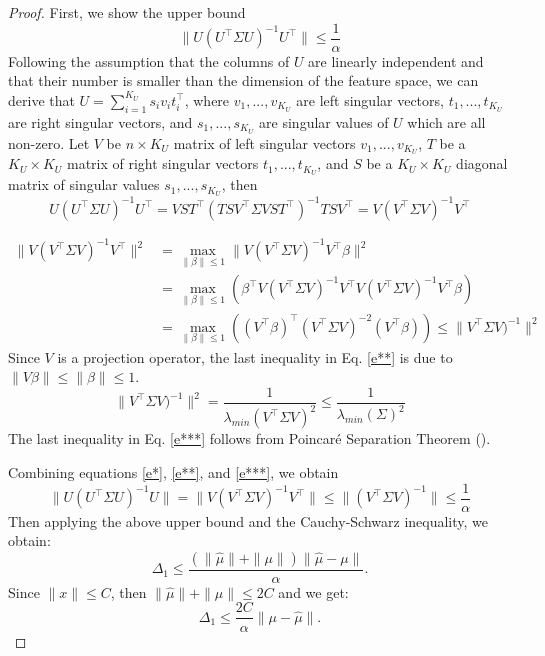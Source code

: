 \documentclass[twoside,11pt]{article}
\begin{document}
\begin{proof}
First, we show the upper bound
\begin{equation}
\label{eq:U_bound}
\|U(U^\top \Sigma U)^{-1}U^\top\| \leq \frac{1}{\alpha}
\end{equation}
Following the assumption that the columns of $U$ are linearly independent and that their number is smaller than the dimension of the feature space, we can derive that
$U=\sum_{i=1}^{K_U} s_i v_i t_i^\top$, where $v_1,...,v_{K_U}$ are left singular vectors, $t_1,...,t_{K_U}$ are right singular vectors, and $s_1,...,s_{K_U}$ are singular values of $U$ which are all non-zero. %
Let $V$ be $n\times {K_U}$ matrix of left singular vectors $v_1,...,v_{K_U}$, $T$ be a $K_U\times K_U$ matrix of right singular vectors $t_1,...,t_{K_U}$, and $S$ be a $K_U\times K_U$ diagonal matrix of singular values $s_1,...,s_{K_U}$, then
\begin{equation}
\label{e*}
U(U^\top \Sigma U)^{-1}U^\top=VST^\top(TSV^\top\Sigma VST^\top)^{-1}TSV^\top =
 V(V^\top\Sigma V)^{-1}V^\top
\end{equation}

\begin{align}
\label{e**}
\|V(V^\top\Sigma V)^{-1}V^\top\|^2&=\max_{\|\beta\|\leq 1}\|V(V^\top\Sigma V)^{-1}V^\top\beta\|^2\\ \nonumber&=\max_{\|\beta\|\leq 1}(\beta^\top V(V^\top\Sigma V)^{-1}V^\top V(V^\top\Sigma V)^{-1}V^\top\beta)\\ \nonumber&=\max_{\|\beta\|\leq 1}((V^\top\beta)^\top(V^\top\Sigma V)^{-2}(V^\top\beta))\leq \|V^\top\Sigma V)^{-1}\|^2
\end{align}
Since $V$ is a projection operator, the last inequality in Eq. \ref{e**} is due to $\|V\beta\|\leq \|\beta\| \leq 1$.
\begin{equation}
\label{e***}
\|V^\top\Sigma V)^{-1}\|^2=\frac{1}{\lambda_{min}(V^\top\Sigma V)^2}\leq \frac{1}{\lambda_{min}(\Sigma)^2}
\end{equation}
The last inequality in Eq. \ref{e***} follows from Poincar\'e Separation Theorem (\cite{PST}).

Combining equations \ref{e*}, \ref{e**}, and \ref{e***}, we obtain
$$\|U(U^\top \Sigma U)^{-1}U\|=\|V(V^\top\Sigma V)^{-1}V^\top\|\leq\|(V^\top\Sigma V)^{-1}\|\leq  \frac{1}{\alpha}$$
Then applying the above upper bound and the Cauchy-Schwarz inequality,  we obtain:
$$\Delta_1\leq \frac{(\|\hat{\mu}\|+\|\mu\|)\|\hat{\mu}-\mu\|}{\alpha}.$$
Since $\|x\| \le C$, then $\|\hat \mu\| + \|\mu\| \le 2C$ and we get:
$$\Delta_1 \leq \frac{2C}{\alpha}\|\mu-\hat{\mu}\|.$$


\end{proof}
\end{document}
